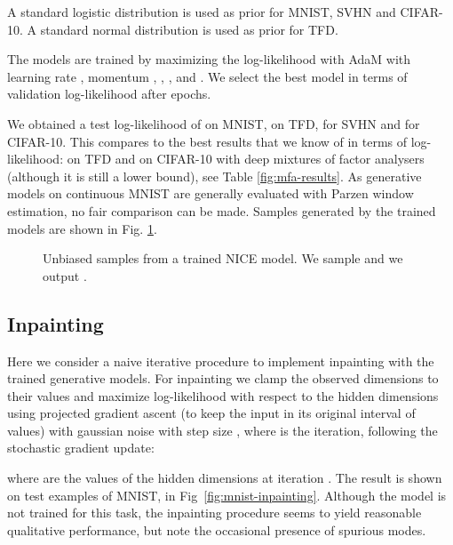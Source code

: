 \documentclass{article}
\begin{document}
A standard logistic
distribution is used as prior for MNIST, SVHN and CIFAR-10. A standard normal distribution is used as prior for TFD.

The models are trained by maximizing the log-likelihood  with AdaM \citep{kingma2014adam} with
learning rate , momentum , ,
, and . We select the best model in terms of 
validation log-likelihood after  epochs.


We obtained a test log-likelihood of  on MNIST,  on TFD,
 for SVHN and  for CIFAR-10. This compares to the best
results that we know of in terms of log-likelihood:  on TFD and 
on CIFAR-10 with deep mixtures of factor analysers \citep{tang2012deep} (although it is still a lower bound), see Table
\ref{fig:mfa-results}.
As generative models on continuous MNIST are generally evaluated with
Parzen window estimation, no fair comparison can be made.
Samples generated by the trained models are shown in Fig. \ref{fig:samples}.


\begin{figure}
    \centering {}
    \caption{Unbiased samples from a trained NICE model. We sample
         and we output .}
    \label{fig:samples}
\end{figure}

\subsection{Inpainting}
Here we consider a naive iterative procedure to implement inpainting with
the trained generative models. For inpainting we clamp the observed dimensions  to
their values and maximize log-likelihood with respect to the hidden
dimensions  using projected gradient ascent (to keep the input in its
original interval of values) with gaussian noise with step size
, where  is the iteration, following the 
stochastic gradient update:

where  are the values of the hidden dimensions at iteration .
The result is shown on test examples of MNIST, in Fig~\ref{fig:mnist-inpainting}.
Although the model is not trained for this
task, the inpainting procedure seems to yield reasonable qualitative
performance, but note the occasional presence of spurious modes.
\end{document}
